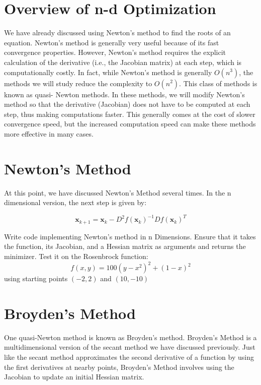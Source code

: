 

\section*{Overview of n-d Optimization}
We have already discussed using Newton's method to find the roots of an
equation. Newton's method is generally very useful because of its fast
convergence properties. However, Newton's method requires the explicit
calculation of the derivative (i.e., the Jacobian matrix) at each step,
which is computationally costly. In fact, while Newton's method is generally  $O(n^3)$,
the methods we will study reduce the complexity to $O(n^2)$. This class of methods is known as quasi-
Newton methods. In these methods, we will modify Newton's method so that the derivative (Jacobian)
does not have to be computed at each step, thus making computations faster.
This generally comes at the cost of slower convergence speed, but the increased
computation speed can make these methods more effective in many cases.

\section*{Newton's Method}
At this point, we have discussed Newton's Method several times. In the n dimensional version,
the next step is given by:

\begin{equation} \label{Eq:BasicNewton}
\mathbf{x}_{k+1} = \mathbf{x}_k - D^2f(\mathbf{x}_k)^{-1}Df(\mathbf{x}_k)^T
\end{equation}

\begin{problem}
Write code implementing Newton's method in n Dimensions. Ensure that it takes
the function, its Jacobian, and a Hessian matrix as arguments and returns the 
minimizer. Test it on the Rosenbrock function:
\[
f(x,y) = 100(y-x^2)^2 + (1-x)^2
\]
using starting points $(-2,2)$ and $(10,-10)$
\end{problem}

\section*{Broyden's Method}
One quasi-Newton method is known as Broyden's method. Broyden's Method is a
multidimensional version of the secant method we have discussed previously.
Just like the secant method approximates the second derivative of a function by
using the first derivatives at nearby points, Broyden's Method involves using
the Jacobian to update an initial Hessian matrix.

